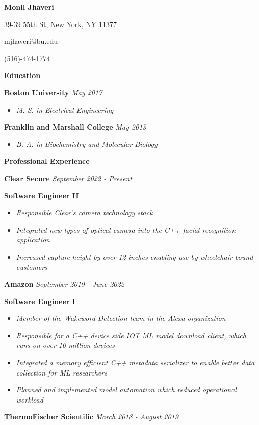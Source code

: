 \documentclass[8pt]{extarticle}
\begin{document}
\begin{center} 
\large \textbf{Monil Jhaveri}


39-39 55th St, New York, NY 11377

mjhaveri@bu.edu 

(516)-474-1774 
\end{center} 
\begin{changemargin}{-0.8cm}{0.0cm}
\textbf{Education}
\end{changemargin}
\vspace*{-0.4cm}
\makebox[\linewidth]{\rule{17cm}{0.4pt}}
\textbf{Boston University} \textit{May 2017}
\begin{itemize}
\item \textit{M. S. in Electrical Engineering}
\end{itemize}
\textbf{Franklin and Marshall College} \textit{May 2013}
\begin{itemize}
\item \textit{B. A. in Biochemistry and Molecular Biology }

\end{itemize}
\begin{changemargin}{-0.8cm}{0.0cm}
	\textbf{Professional Experience}
\end{changemargin}
\vspace*{-0.4cm}
\makebox[\linewidth]{\rule{17cm}{0.4pt}}
\textbf{Clear Secure} \hfill\textit{September 2022 - Present}

{\tiny }
\textbf{Software Engineer II}
\begin{itemize}
	\item \textit{Responsible Clear's camera technology stack}
	\item \textit{Integrated new types of optical camera into the C++ facial recognition application }
	\item \textit{Increased capture height by over 12 inches enabling use by wheelchair bound customers}
\end{itemize}
\textbf{Amazon} \hfill\textit{September 2019 - June 2022}

{\tiny }
\textbf{Software Engineer I}
\begin{itemize}
	\item \textit{Member of the Wakeword Detection team in the Alexa organization}
	\item \textit{Responsible for a C++ device side IOT ML model download client, which runs on over 10 million devices}
	\item \textit{Integrated a memory efficient C++ metadata serializer to enable better data collection for ML researchers}
	\item \textit{Planned and implemented model automation which reduced operational workload}
\end{itemize}
\textbf{ThermoFischer Scientific} \hfill\textit{March 2018 - August 2019}
\end{document}
